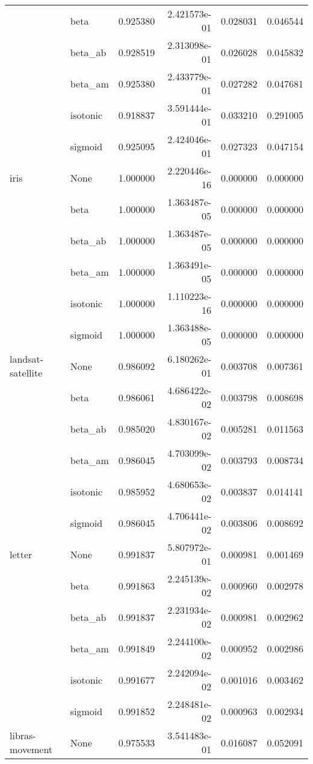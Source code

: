 \begin{tabular}{llrrrr}
        & beta &  0.925380 &  2.421573e-01 &  0.028031 &  0.046544 \\
        & beta\_ab &  0.928519 &  2.313098e-01 &  0.026028 &  0.045832 \\
        & beta\_am &  0.925380 &  2.433779e-01 &  0.027282 &  0.047681 \\
        & isotonic &  0.918837 &  3.591444e-01 &  0.033210 &  0.291005 \\
        & sigmoid &  0.925095 &  2.424046e-01 &  0.027323 &  0.047154 \\
iris & None &  1.000000 &  2.220446e-16 &  0.000000 &  0.000000 \\
        & beta &  1.000000 &  1.363487e-05 &  0.000000 &  0.000000 \\
        & beta\_ab &  1.000000 &  1.363487e-05 &  0.000000 &  0.000000 \\
        & beta\_am &  1.000000 &  1.363491e-05 &  0.000000 &  0.000000 \\
        & isotonic &  1.000000 &  1.110223e-16 &  0.000000 &  0.000000 \\
        & sigmoid &  1.000000 &  1.363488e-05 &  0.000000 &  0.000000 \\
landsat-satellite & None &  0.986092 &  6.180262e-01 &  0.003708 &  0.007361 \\
        & beta &  0.986061 &  4.686422e-02 &  0.003798 &  0.008698 \\
        & beta\_ab &  0.985020 &  4.830167e-02 &  0.005281 &  0.011563 \\
        & beta\_am &  0.986045 &  4.703099e-02 &  0.003793 &  0.008734 \\
        & isotonic &  0.985952 &  4.680653e-02 &  0.003837 &  0.014141 \\
        & sigmoid &  0.986045 &  4.706441e-02 &  0.003806 &  0.008692 \\
letter & None &  0.991837 &  5.807972e-01 &  0.000981 &  0.001469 \\
        & beta &  0.991863 &  2.245139e-02 &  0.000960 &  0.002978 \\
        & beta\_ab &  0.991837 &  2.231934e-02 &  0.000981 &  0.002962 \\
        & beta\_am &  0.991849 &  2.244100e-02 &  0.000952 &  0.002986 \\
        & isotonic &  0.991677 &  2.242094e-02 &  0.001016 &  0.003462 \\
        & sigmoid &  0.991852 &  2.248481e-02 &  0.000963 &  0.002934 \\
libras-movement & None &  0.975533 &  3.541483e-01 &  0.016087 &  0.052091 \\

\end{tabular}
